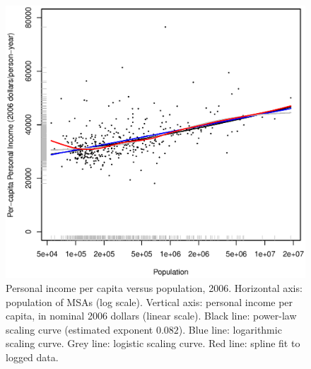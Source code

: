 \documentclass{pnastwo}
\begin{document}
\begin{figure}
\includegraphics[width=\columnwidth]{personal-income-per-capita}
\caption{Personal income per capita versus population, 2006.  Horizontal axis:
  population of MSAs (log scale).  Vertical axis: personal income per capita,
  in nominal 2006 dollars (linear scale).  Black line: power-law scaling curve
  (estimated exponent $0.082$).  Blue line: logarithmic scaling curve.  Grey
  line: logistic scaling curve.  Red line: spline fit to logged data.}
\label{fig:personal-income-per-capita}
\end{figure}
\end{document}
